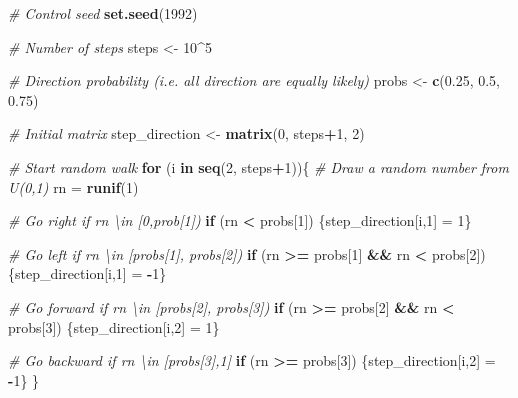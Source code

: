 \documentclass[12pt,]{krantz}
\newenvironment{Shaded}{\begin{snugshade}}{\end{snugshade}}
\newcommand{\KeywordTok}[1]{\textcolor[rgb]{0.27,0.27,0.27}{\textbf{#1}}}
\newcommand{\DecValTok}[1]{\textcolor[rgb]{0.06,0.06,0.06}{#1}}
\newcommand{\FloatTok}[1]{\textcolor[rgb]{0.06,0.06,0.06}{#1}}
\newcommand{\StringTok}[1]{\textcolor[rgb]{0.5,0.5,0.5}{#1}}
\newcommand{\CommentTok}[1]{\textcolor[rgb]{0.37,0.37,0.37}{\textit{#1}}}
\newcommand{\ControlFlowTok}[1]{\textcolor[rgb]{0.27,0.27,0.27}{\textbf{#1}}}
\newcommand{\OperatorTok}[1]{\textcolor[rgb]{0.43,0.43,0.43}{\textbf{#1}}}
\newcommand{\NormalTok}[1]{#1}
\begin{document}
\begin{Shaded}
\begin{Highlighting}[]
\CommentTok{# Control seed}
\KeywordTok{set.seed}\NormalTok{(}\DecValTok{1992}\NormalTok{)}

\CommentTok{# Number of steps}
\NormalTok{steps <-}\StringTok{ }\DecValTok{10}\OperatorTok{^}\DecValTok{5}

\CommentTok{# Direction probability (i.e. all direction are equally likely)}
\NormalTok{probs <-}\StringTok{ }\KeywordTok{c}\NormalTok{(}\FloatTok{0.25}\NormalTok{, }\FloatTok{0.5}\NormalTok{, }\FloatTok{0.75}\NormalTok{)}

\CommentTok{# Initial matrix}
\NormalTok{step_direction <-}\StringTok{ }\KeywordTok{matrix}\NormalTok{(}\DecValTok{0}\NormalTok{, steps}\OperatorTok{+}\DecValTok{1}\NormalTok{, }\DecValTok{2}\NormalTok{)}

\CommentTok{# Start random walk}
\ControlFlowTok{for}\NormalTok{ (i }\ControlFlowTok{in} \KeywordTok{seq}\NormalTok{(}\DecValTok{2}\NormalTok{, steps}\OperatorTok{+}\DecValTok{1}\NormalTok{))\{}
  \CommentTok{# Draw a random number from U(0,1)}
\NormalTok{  rn =}\StringTok{ }\KeywordTok{runif}\NormalTok{(}\DecValTok{1}\NormalTok{)}

  \CommentTok{# Go right if rn \textbackslash{}in [0,prob[1])}
  \ControlFlowTok{if}\NormalTok{ (rn }\OperatorTok{<}\StringTok{ }\NormalTok{probs[}\DecValTok{1}\NormalTok{]) \{step_direction[i,}\DecValTok{1}\NormalTok{] =}\StringTok{ }\DecValTok{1}\NormalTok{\}}

  \CommentTok{# Go left if rn \textbackslash{}in [probs[1], probs[2])}
  \ControlFlowTok{if}\NormalTok{ (rn }\OperatorTok{>=}\StringTok{ }\NormalTok{probs[}\DecValTok{1}\NormalTok{] }\OperatorTok{&&}\StringTok{ }\NormalTok{rn }\OperatorTok{<}\StringTok{ }\NormalTok{probs[}\DecValTok{2}\NormalTok{]) \{step_direction[i,}\DecValTok{1}\NormalTok{] =}\StringTok{ }\OperatorTok{-}\DecValTok{1}\NormalTok{\}}

  \CommentTok{# Go forward if rn \textbackslash{}in [probs[2], probs[3])}
  \ControlFlowTok{if}\NormalTok{ (rn }\OperatorTok{>=}\StringTok{ }\NormalTok{probs[}\DecValTok{2}\NormalTok{] }\OperatorTok{&&}\StringTok{ }\NormalTok{rn }\OperatorTok{<}\StringTok{ }\NormalTok{probs[}\DecValTok{3}\NormalTok{]) \{step_direction[i,}\DecValTok{2}\NormalTok{] =}\StringTok{ }\DecValTok{1}\NormalTok{\}}

  \CommentTok{# Go backward if rn \textbackslash{}in [probs[3],1]}
  \ControlFlowTok{if}\NormalTok{ (rn }\OperatorTok{>=}\StringTok{ }\NormalTok{probs[}\DecValTok{3}\NormalTok{]) \{step_direction[i,}\DecValTok{2}\NormalTok{] =}\StringTok{ }\OperatorTok{-}\DecValTok{1}\NormalTok{\}}
\NormalTok{\}}


\end{Highlighting}
\end{Shaded}
\end{document}

